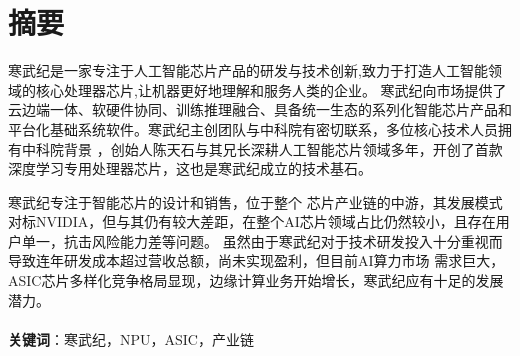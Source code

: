\section*{摘\quad 要}

\hspace{8mm}寒武纪是一家专注于人工智能芯片产品的研发与技术创新,致力于打造人工智能领域的核心处理器芯片,让机器更好地理解和服务人类的企业。
寒武纪向市场提供了云边端一体、软硬件协同、训练推理融合、具备统一生态的系列化智能芯片产品和平台化基础系统软件。寒武纪主创团队与中科院有密切联系，多位核心技术人员拥有中科院背景
，创始人陈天石与其兄长深耕人工智能芯片领域多年，开创了首款深度学习专用处理器芯片，这也是寒武纪成立的技术基石。\par
寒武纪专注于智能芯片的设计和销售，位于整个
芯片产业链的中游，其发展模式对标NVIDIA，但与其仍有较大差距，在整个AI芯片领域占比仍然较小，且存在用户单一，抗击风险能力差等问题。
虽然由于寒武纪对于技术研发投入十分重视而导致连年研发成本超过营收总额，尚未实现盈利，但目前AI算力市场
需求巨大，ASIC芯片多样化竞争格局显现，边缘计算业务开始增长，寒武纪应有十足的发展潜力。\\
~\\
\textbf{关键词}：寒武纪，NPU，ASIC，产业链\\
